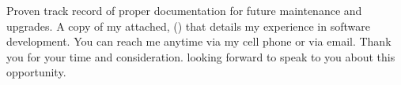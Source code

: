\documentclass{subfiles}
\begin{document}
Proven track record of proper documentation for future maintenance and upgrades.
A copy of my  attached, 
() 
that details my experience in software development.
\newline
You can reach me anytime via my cell phone or via email.
Thank you for your time and consideration. looking forward to speak to you about this opportunity.

\makeletterclosing %

\newpage
\end{document}
